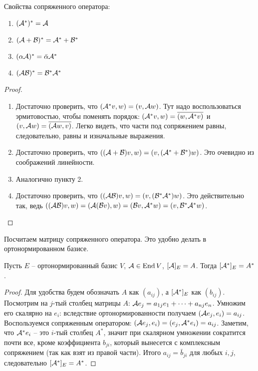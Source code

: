 \begin{theorem-non}
    Свойства сопряженного оператора:
    \begin{enumerate}
        \item $(\mathcal{A}^*)^* = \mathcal{A}$
        \item $(\mathcal{A} + \mathcal{B})^* = \mathcal{A}^* + \mathcal{B}^*$
        \item $(\alpha \mathcal{A})^* = \bar{\alpha} \mathcal{A}^*$
        \item $(\mathcal{A}\mathcal{B})^* = \mathcal{B}^*\mathcal{A}^*$
    \end{enumerate}
\end{theorem-non}
\begin{proof} \quad

    \begin{enumerate}
        \item Достаточно проверить, что $(\mathcal{A}^*v, w) = (v, \mathcal{A} w)$. Тут надо воспользоваться эрмитовостью, чтобы поменять порядок: $(\mathcal{A}^*v, w) = \overline{(w, \mathcal{A}^*v)}$ и $(v, \mathcal{A} w) = \overline{(\mathcal{A} w, v)}$. Легко видеть, что части под сопряжением равны, следовательно, равны и изначальные выражения.
        \item Достаточно проверить, что $((\mathcal{A} + \mathcal{B})v, w) = (v, (\mathcal{A}^* + \mathcal{B}^*)w)$. Это очевидно из соображений линейности.
        \item Аналогично пункту 2.
        \item Достаточно проверить, что $((\mathcal{A}\mathcal{B})v, w) = (v, (\mathcal{B}^*\mathcal{A}^*)w)$. Это действительно так, ведь $((\mathcal{A}\mathcal{B})v, w) = (\mathcal{A}(\mathcal{B} v), w) = (\mathcal{B} v, \mathcal{A}^*w) = (v, \mathcal{B}^*\mathcal{A}^*w)$.
    \end{enumerate}
\end{proof}

Посчитаем матрицу сопряженного оператора. Это удобно делать в ортонормированном базисе.
\begin{theorem-non}
    Пусть $E$ -- ортонормированный базис $V$, $\mathcal{A} \in \operatorname{End} V$, $[\mathcal{A}]_E = A$.
    Тогда $[\mathcal{A}^*]_E = A^*$.
\end{theorem-non}
\begin{proof}
    Для удобства будем обозначать $A$ как $(a_{ij})$, а $[\mathcal{A}^*]_E$ как $(b_{ij})$.
    Посмотрим на $j$-тый столбец матрицы $A$: $\mathcal{A} e_j = a_{1j}e_1 + \dots + a_{nj}e_n$.
    Умножим его скалярно на $e_i$: вследствие ортонормированности получаем $(\mathcal{A} e_j, e_i) = a_{ij}$. 
    Воспользуемся сопряженным оператором: $(\mathcal{A} e_j, e_i) = (e_j, \mathcal{A}^* e_i) = a_{ij}$. 
    Заметим, что $\mathcal{A}^* e_i$ -- это $i$-тый столбец $A^*$, значит при скалярном умножении сократится почти все, кроме коэффициента $b_{ji}$, который вынесется с комплексным сопряжением (так как взят из правой части).
    Итого $a_{ij} = \bar{b}_{ji}$ для любых $i, j$, следовательно $[\mathcal{A}^*]_E = A^*$.
\end{proof}

